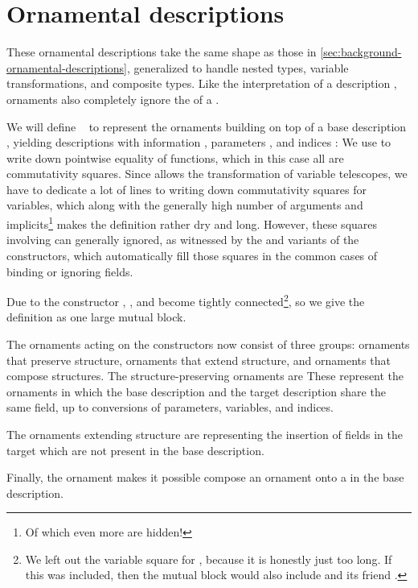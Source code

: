 \section{Ornamental descriptions}
These ornamental descriptions take the same shape as those in \autoref{sec:background-ornamental-descriptions}, generalized to handle nested types, variable transformations, and composite types. Like the interpretation of a description , ornaments also completely ignore the  of a .

We will define \  to represent the ornaments building on top of a base description , yielding descriptions with information , parameters , and indices :
We use  to write down pointwise equality of functions, which in this case all are commutativity squares. Since  allows the transformation of variable telescopes, we have to dedicate a lot of lines to writing down commutativity squares for variables, which along with the generally high number of arguments and implicits\footnote{Of which even more are hidden!} makes the definition rather dry and long. However, these squares involving  can generally ignored, as witnessed by the  and  variants of the constructors, which automatically fill those squares in the common cases of binding or ignoring fields.

Due to the  constructor , , and  become tightly connected\footnote{We left out the variable square for , because it is honestly just too long. If this was included, then the mutual block would also include  and its friend .}, so we give the definition as one large mutual block.

The ornaments acting on the constructors now consist of three groups: ornaments that preserve structure, ornaments that extend structure, and ornaments that compose structures. The structure-preserving ornaments are
These represent the ornaments in which the base description and the target description share the same field, up to conversions of parameters, variables, and indices.

The ornaments extending structure are
representing the insertion of fields in the target which are not present in the base description.

Finally, the ornament
makes it possible compose an ornament onto a  in the base description.

